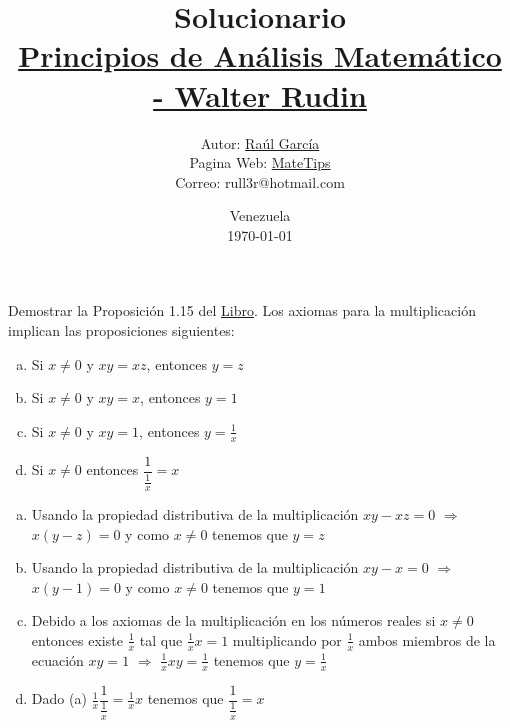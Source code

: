 \documentclass[10pt,a4paper]{jhwhw}
\author{Autor: \href{https://www.facebook.com/ruller}{Raúl García}\\Pagina Web: \href{https://rull3r.github.io/}{MateTips}\\Correo: rull3r@hotmail.com}
\date{Venezuela\\ \today \\}
\title{Solucionario \\\href{https://books.google.co.ve/books?id=i4aToAEACAAJ}{Principios de Análisis Matemático - Walter Rudin}\\}
\begin{document}
	
	\problema{ }\label{pro:3}
	Demostrar la Proposición 1.15 del \href{https://books.google.co.ve/books?id=i4aToAEACAAJ}{Libro}.
	Los axiomas para la multiplicación implican las proposiciones siguientes:
	
	\begin{enumerate}[(a)]
		\item Si $x \neq 0$ y $xy=xz$, entonces $y=z$
		\item Si $x \neq 0$ y $xy=x$, entonces $y=1$
		\item Si $x \neq 0$ y $xy=1$, entonces $y=\frac{1}{x}$
		\item Si $x \neq 0$ entonces $\dfrac{1}{\frac{1}{x}}=x$
	\end{enumerate}

	\solution 
	
	\begin{enumerate}[(a)]
		\item Usando la propiedad distributiva de la multiplicación $xy-xz=0$ $\Rightarrow$ $x(y-z)=0$ y como $x\neq0$ tenemos que $y=z$ \QEPD
		
		\item Usando la propiedad distributiva de la multiplicación $xy-x=0$ $\Rightarrow$ $x(y-1)=0$ y como $x\neq0$ tenemos que $y=1$ \QEPD 
		
		\item Debido a los axiomas de la multiplicación en los números reales si $x \neq 0$ entonces existe $\frac{1}{x}$ tal que $\frac{1}{x}x=1$ multiplicando por $\frac{1}{x}$ ambos miembros de la ecuación $xy=1$ $\Rightarrow$ $\frac{1}{x}xy=\frac{1}{x}$ tenemos que $y=\frac{1}{x}$ \QEPD
		
		\item Dado (a)  $\frac{1}{x}\dfrac{1}{\frac{1}{x}}=\frac{1}{x}x$ tenemos que $\dfrac{1}{\frac{1}{x}}=x$ \QEPD
		
	\end{enumerate}
	
	
\end{document}
